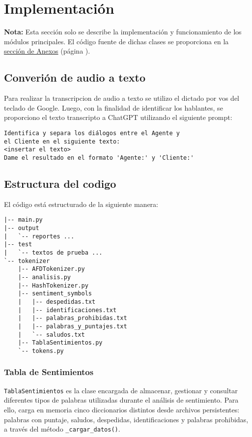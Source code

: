 \section{Implementación}
\noindent\textbf{Nota:} Esta sección solo se describe la implementación y funcionamiento de los
módulos principales. El código fuente de dichas clases se proporciona en la
\hyperref[sec:Anexos]{sección de Anexos} (página \pageref{sec:Anexos}).

\subsection{Converión de audio a texto}

Para realizar la transcripcion de audio a texto se utilizo el dictado por vos del teclado de
Google. Luego, con la finalidad de identificar los hablantes, se proporciono el
texto transcripto a ChatGPT utilizando el siguiente prompt:

\begin{verbatim}
Identifica y separa los diálogos entre el Agente y 
el Cliente en el siguiente texto:
<insertar el texto>
Dame el resultado en el formato 'Agente:' y 'Cliente:'
\end{verbatim}

\subsection{Estructura del codigo}
El código está estructurado de la siguiente manera:

\begin{tcolorbox}[colback=gray!10, colframe=gray!80, sharp corners, boxrule=0.5pt]
	\begin{verbatim}
|-- main.py
|-- output
|   `-- reportes ...
|-- test
|   `-- textos de prueba ...
`-- tokenizer
    |-- AFDTokenizer.py
    |-- analisis.py
    |-- HashTokenizer.py
    |-- sentiment_symbols
    |   |-- despedidas.txt
    |   |-- identificaciones.txt
    |   |-- palabras_prohibidas.txt
    |   |-- palabras_y_puntajes.txt
    |   `-- saludos.txt
    |-- TablaSentimientos.py
    `-- tokens.py
\end{verbatim}
\end{tcolorbox}

\subsubsection{Tabla de Sentimientos}
\texttt{TablaSentimientos} es la clase encargada de almacenar, gestionar y consultar
diferentes tipos de palabras utilizadas durante el análisis de sentimiento. Para ello, carga en
memoria cinco diccionarios distintos desde archivos persistentes: palabras con puntaje,
saludos, despedidas, identificaciones y palabras prohibidas, a través del método \texttt{\_cargar\_datos()}.

